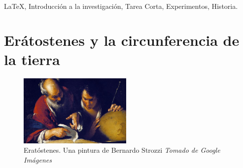 \documentclass[journal]{IEEEtran}
\begin{document}







\maketitle



\begin{IEEEkeywords}
\LaTeX\xspace , Introducción a la investigación, Tarea Corta, Experimentos, Historia.
\end{IEEEkeywords}






%
\IEEEpeerreviewmaketitle



\section{Erátostenes y la circunferencia de la tierra}
\begin{center}
  \begin{figure}[h!]
  \includegraphics[width=55mm]{eratostenes1.jpeg}
  \caption{Eratóstenes. Una pintura de Bernardo Strozzi \emph{Tomado de Google Imágenes}}
  \end{figure}
\end{center}
\end{document}
